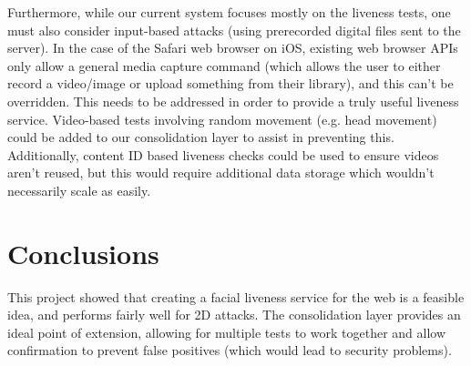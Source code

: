 \documentclass[10pt,a4paper]{article}
\begin{document}
    Furthermore, while our current system focuses mostly on the liveness tests, one must also consider input-based attacks (using prerecorded digital files
    sent to the server). In the case of the Safari web browser on iOS, existing web browser APIs only allow a general media capture command (which allows the user to
    either record a video/image or upload something from their library), and this can't be overridden. This needs to be addressed in order to provide a truly useful
    liveness service. Video-based tests involving random movement (e.g. head movement) could be added to our consolidation layer to assist in preventing this. Additionally, content ID
    based liveness checks could be used to ensure videos aren't reused, but this would require additional data storage which wouldn't necessarily scale as easily.

\section{Conclusions}
    This project showed that creating a facial liveness service for the web is a feasible idea, and performs fairly well for 2D attacks. The consolidation layer provides
    an ideal point of extension, allowing for multiple tests to work together and allow confirmation to prevent false positives (which would lead to security problems).



\end{document}
